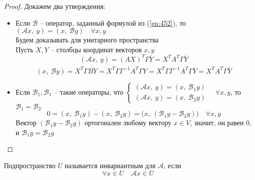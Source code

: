 \begin{proof}
	Докажем два утверждения:
	\begin{itemize}
		\item Если $ \mathcal{B} $ -- оператор, заданный формулой из (\ref{en:452}), то $ (\mathcal{A}x, ~ y) = (x, ~ \mathcal{B}y) \quad \forall x, y $ \\
		Будем доказывать для унитарного пространства \\
		Пусть $ X, Y $ -- столбцы координат векторов $ x, y $
		$$ (\mathcal{A}x, ~ y) = (AX)^T\Gamma\overline{Y} = X^TA^T\Gamma\overline{Y} $$
		$$ (x, ~ \mathcal{B}y) = X^T\Gamma\overline{BY} = X^T\Gamma\overline{\overline{\Gamma^{-1}A^T\Gamma}Y} = X^T\Gamma\Gamma^{-1}A^T\Gamma\overline{Y} = X^TA^T\Gamma\overline{Y} $$
		\item Если $ \mathcal{B}_1, \mathcal{B}_1 $ -- такие операторы, что $
		\begin{cases}
			(\mathcal{A}x, ~ y) = (x, ~ \mathcal{B}_1y) \\
			(\mathcal{A}x, ~ y) = (x, ~ \mathcal{B}_2y)
		\end{cases} \quad \forall x, y $, то $ \mathcal{B}_1 = \mathcal{B}_2 $
		$$ 0 = (x, ~ \mathcal{B}_1y) - (x, ~ \mathcal{B}_2y) = \bigg( x, ~ (\mathcal{B}_1y - \mathcal{B}_2y) \bigg) \quad \forall x, y $$
		Вектор $ (\mathcal{B}_1y - \mathcal{B}_2y) $ ортогонален любому вектору $ x \in V $, значит, он равен 0, и $ \mathcal{B}_1y = \mathcal{B}_2y $
	\end{itemize}
\end{proof}

\begin{definition}
	Подпространство $ U $ называется инвариантным для $ \mathcal{A} $, если
	$$ \forall x \in U \quad \mathcal{A}x \in U $$
\end{definition}

